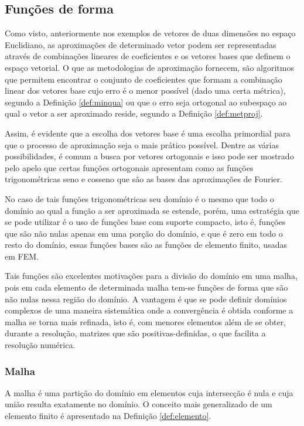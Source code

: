 	\subsection{Funções de forma}
	Como visto, anteriormente nos exemplos de vetores de duas dimensões no espaço Euclidiano, as aproximações de determinado vetor podem ser representadas através de combinações lineares de coeficientes e os vetores bases que definem o espaço vetorial. O que as metodologias de aproximação fornecem, são algoritmos que permitem encontrar o conjunto de coeficientes que formam a combinação linear dos vetores base cujo erro é o menor possível (dado uma certa métrica), segundo a Definição \ref{def:minqua} ou que o erro seja ortogonal ao subespaço ao qual o vetor a ser aproximado reside, segundo a Definição \ref{def:metproj}.

  	Assim, é evidente que a escolha dos vetores base é uma escolha primordial para que o processo de aproximação seja o mais prático possível. Dentre as várias possibilidades, é comum a busca por vetores ortogonais e isso pode ser mostrado pelo apelo que certas funções ortogonais apresentam como as funções trigonométricas seno e cosseno que são as bases das aproximações de Fourier.

  	No caso de tais funções trigonométricas seu domínio é o mesmo que todo o domínio ao qual a função a ser aproximada se estende, porém, uma estratégia que se pode utilizar é o uso de funções base com suporte compacto, isto é, funções que são não nulas apenas em uma porção do domínio, e que é zero em todo o resto do domínio, essas funções bases são as funções de elemento finito, usadas em FEM.

  Tais funções são excelentes motivações para a divisão do domínio em uma malha, pois em cada elemento de determinada malha tem-se funções de forma que são não nulas nessa região do domínio. A vantagem é que se pode definir domínios complexos de uma maneira sistemática onde a convergência é obtida conforme a malha se torna mais refinada, isto é, com menores elementos além de se obter,  durante a resolução, matrizes que são positivas-definidas, o que facilita a  resolução numérica.

    \subsubsection{Malha}
    	A malha é uma partição do domínio em elementos cuja intersecção é nula e cuja união resulta exatamente no domínio. O conceito mais generalizado de um elemento finito é apresentado na Definição \ref{def:elemento}.

